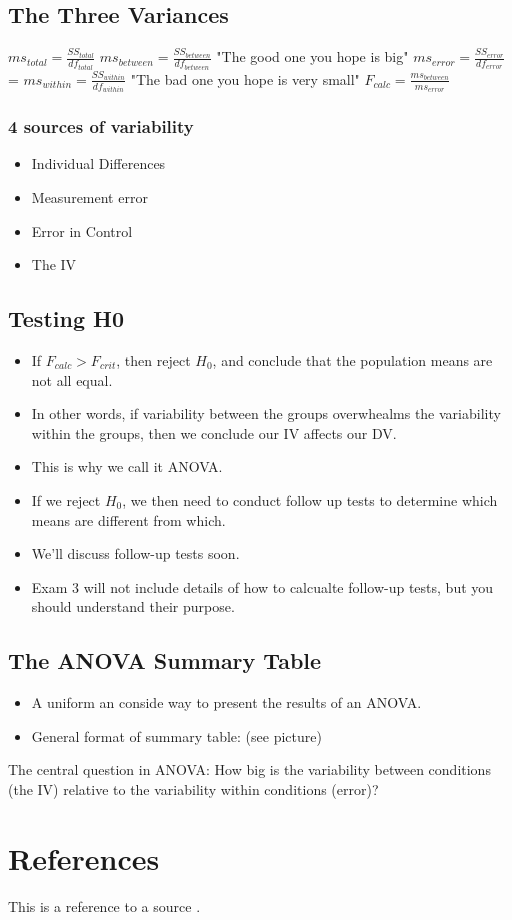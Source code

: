 \documentclass[11pt]{report}
\begin{document}
\subsection{The Three Variances}
$ms_{total} = \frac{SS_{total}}{df_{total}}$ \newline
$ms_{between} = \frac{SS_{between}}{df_{between}}$ "The good one you hope is big" \newline
$ms_{error} = \frac{SS_{error}}{df_{error}}$ = $ms_{within} = \frac{SS_{within}}{df_{within}}$ "The bad one you hope is very small" \newline
$F_{calc} = \frac{ms_{between}}{ms_{error}}$ \newline

\subsubsection{4 sources of variability}
\begin{itemize}
    \item Individual Differences
    \item Measurement error 
    \item Error in Control
    \item The IV 
\end{itemize} 

\subsection{Testing H0}
\begin{itemize}
    \item If $F_{calc} > F_{crit}$, then reject $H_0$, and conclude that the population means are not all equal.
    \item In other words, if variability between the groups overwhealms the variability within the groups, then we conclude our IV affects our DV. 
    \item This is why we call it ANOVA.
    \item If we reject $H_0$, we then need to conduct follow up tests to determine which means are different from which. 
    \item We'll discuss follow-up tests soon.
    \item Exam 3 will not include details of how to calcualte follow-up tests, but you should understand their purpose. 
\end{itemize}

\subsection{The ANOVA Summary Table}
\begin{itemize}
    \item A uniform an conside way to present the results of an ANOVA.
    \item General format of summary table: (see picture)
\end{itemize}

The central question in ANOVA: How big is the variability between conditions (the IV) relative to the variability within conditions (error)? 



\section{References}
This is a reference to a source \cite{example}.



\end{document}
